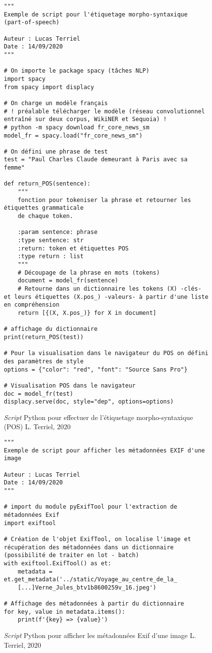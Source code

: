 \begin{figure}[h]
\lstset{language=Python}
\begin{lstlisting}
"""
Exemple de script pour l'étiquetage morpho-syntaxique (part-of-speech)

Auteur : Lucas Terriel
Date : 14/09/2020
"""

# On importe le package spacy (tâches NLP)
import spacy
from spacy import displacy

# On charge un modèle français
# ! préalable télécharger le modèle (réseau convolutionnel entraîné sur deux corpus, WikiNER et Sequoia) !
# python -m spacy download fr_core_news_sm
model_fr = spacy.load("fr_core_news_sm")

# On défini une phrase de test
test = "Paul Charles Claude demeurant à Paris avec sa femme"

def return_POS(sentence):
    """
    fonction pour tokeniser la phrase et retourner les étiquettes grammaticale
    de chaque token.

    :param sentence: phrase
    :type sentence: str
    :return: token et étiquettes POS
    :type return : list
    """
    # Découpage de la phrase en mots (tokens)
    document = model_fr(sentence)
    # Retourne dans un dictionnaire les tokens (X) -clés- et leurs étiquettes (X.pos_) -valeurs- à partir d'une liste en compréhension
    return [{(X, X.pos_)} for X in document]

# affichage du dictionnaire
print(return_POS(test))

# Pour la visualisation dans le navigateur du POS on défini des paramètres de style
options = {"color": "red", "font": "Source Sans Pro"}

# Visualisation POS dans le navigateur
doc = model_fr(test)
displacy.serve(doc, style="dep", options=options)
\end{lstlisting}
\caption{\textit{Script} Python pour effectuer de l'étiquetage morpho-syntaxique (POS) \textcopyright L. Terriel, 2020}
\label{fig:script_python_POS}
\end{figure}

\begin{figure}[h]
\lstset{language=Python}
\begin{lstlisting}
"""
Exemple de script pour afficher les métadonnées EXIF d'une image

Auteur : Lucas Terriel
Date : 14/09/2020
"""

# import du module pyExifTool pour l'extraction de métadonnées Exif
import exiftool

# Création de l'objet ExifTool, on localise l'image et récupération des métadonnées dans un dictionnaire (possibilité de traiter en lot - batch)
with exiftool.ExifTool() as et:
    metadata = et.get_metadata('../static/Voyage_au_centre_de_la_
    [...]Verne_Jules_btv1b8600259v_16.jpeg')

# Affichage des métadonnées à partir du dictionnaire
for key, value in metadata.items():
    print(f'{key} => {value}')

\end{lstlisting}
\caption{\textit{Script} Python pour afficher les métadonnées Exif d'une image \textcopyright L. Terriel, 2020}
\label{fig:script_python_exif}
\end{figure}

